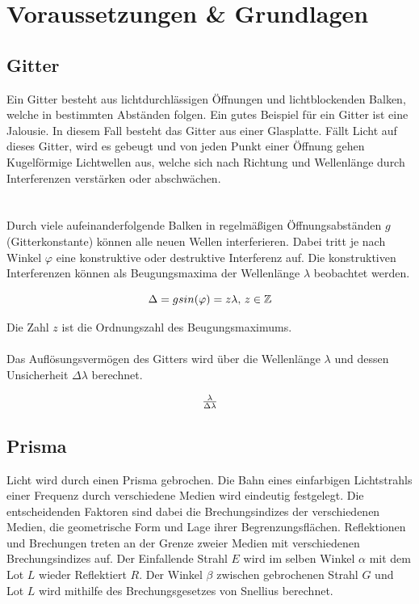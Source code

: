 \documentclass[12pt,a4paper,twoside]{article}
\begin{document}
\section{Voraussetzungen \& Grundlagen} %
\subsection{Gitter}
Ein Gitter besteht aus lichtdurchlässigen Öffnungen und lichtblockenden Balken, welche in bestimmten Abständen folgen. Ein gutes Beispiel für ein Gitter ist eine Jalousie. 
In diesem Fall besteht das Gitter aus einer Glasplatte. Fällt Licht auf dieses Gitter, wird es gebeugt und von jeden Punkt einer Öffnung gehen Kugelförmige Lichtwellen aus, welche sich nach Richtung und Wellenlänge durch Interferenzen verstärken oder abschwächen. 
\\
\\
\\
Durch viele aufeinanderfolgende Balken in regelmäßigen Öffnungsabständen $g$ (Gitterkonstante) können alle neuen Wellen interferieren. Dabei tritt je nach Winkel $\varphi$ eine konstruktive oder destruktive Interferenz auf. 
Die konstruktiven Interferenzen können als Beugungsmaxima der Wellenlänge $\lambda$ beobachtet werden. 

    \begin{equation}
        \label{eq:Gitterkonstante}
        \centerline{$\Delta=g sin(\varphi) = z\lambda$,     $z \in \mathbb{Z} $}
    \end{equation}

\noindent
Die Zahl $z$ ist die Ordnungszahl des Beugungsmaximums. 
\\
\\
Das Auflösungsvermögen des Gitters wird über die Wellenlänge $\lambda$ und dessen Unsicherheit $\Delta \lambda$ berechnet. 

\begin{equation}
    \label{eq:Auflösungsvermögen}
    \centerline{$\frac{\lambda}{\Delta \lambda}$}
\end{equation}

\subsection{Prisma}
Licht wird durch einen Prisma gebrochen. 
Die Bahn eines einfarbigen Lichtstrahls einer Frequenz durch verschiedene Medien wird eindeutig festgelegt. Die entscheidenden Faktoren sind dabei die Brechungsindizes der verschiedenen Medien, die geometrische Form und Lage ihrer Begrenzungsflächen. 
Reflektionen und Brechungen treten an der Grenze zweier Medien mit verschiedenen Brechungsindizes auf. Der Einfallende Strahl $E$ wird im selben Winkel $\alpha$ mit dem Lot $L$ wieder Reflektiert $R$. 
Der Winkel $\beta$ zwischen gebrochenen Strahl $G$ und Lot $L$ wird mithilfe des Brechungsgesetzes von Snellius berechnet. 
\end{document}
